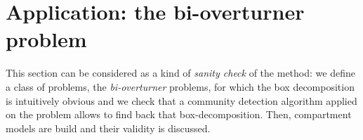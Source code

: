 \chapter{Application: the bi-overturner problem} \label{chap:bioverturner}
This section can be considered as a kind of \textit{sanity check} of the method: we define a class of problems, the \textit{bi-overturner} problems, for which the box decomposition is intuitively obvious and we check that a community detection algorithm applied on the problem allows to find back that box-decomposition. Then, compartment models are build and their validity is discussed.
